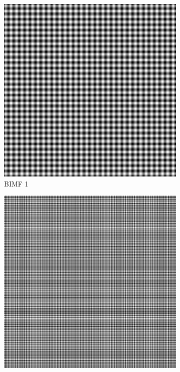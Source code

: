 \begin{figure}
\centering
\begin{subfigure}{.30\textwidth}
  \centering
  \includegraphics[width=.9\linewidth]{img/s_5_1_1}
  \caption{BIMF 1}
\end{subfigure}
\begin{subfigure}{.30\textwidth}
  \centering
  \includegraphics[width=.9\linewidth]{img/s_5_1_2}

\end{subfigure}
\end{figure}
